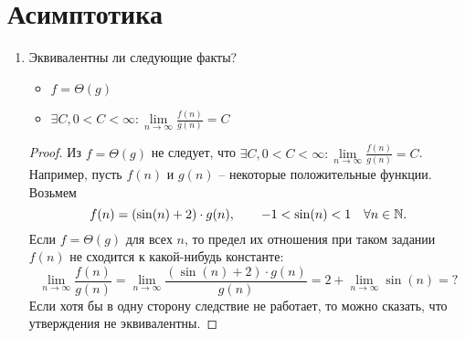 \section{Асимптотика}
\begin{enumerate}
  \item	
	Эквивалентны ли следующие факты?
	\begin{itemize}
		\item $f = \Theta(g)$
		\item $\exists C,  0 < C < \infty : \lim\limits_{n \to \infty} \frac{f(n)}{g(n)} = C$
	\end{itemize}

  \begin{proof}

    Из $f = \Theta(g)$ не следует, что $\exists C,  0 < C < \infty : \lim\limits_{n \to \infty} \frac{f(n)}{g(n)} = C$.
    Например, пусть $f(n)$ и $g(n)$ -- некоторые положительные функции. Возьмем
    \begin{equation}
      f(n) = (\sin(n) + 2)\cdot g(n), \qquad -1 < \sin(n) < 1 \quad \forall n \in \mathbb{N}.
    \end{equation}
    Если $f = \Theta(g)$ для всех $n$, то предел их отношения при таком задании $f(n)$ не сходится к какой-нибудь константе:
    \begin{equation}
      \lim\limits_{n \to \infty} \frac{f(n)}{g(n)} = \lim\limits_{n \to \infty} \frac{(\sin(n) + 2)\cdot g(n)}{g(n)} = 2 + \lim\limits_{n \to \infty} \sin(n) = ?
    \end{equation}
    Если хотя бы в одну сторону следствие не работает, то можно сказать, что утверждения не эквивалентны.


\end{proof}
\end{enumerate}

